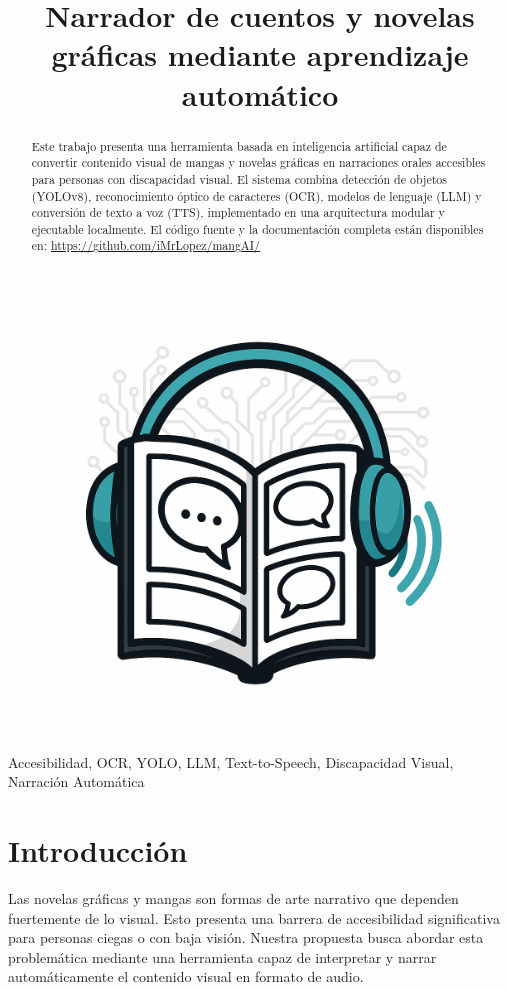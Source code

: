 \documentclass[conference]{IEEEtran}
\title{Narrador de cuentos y novelas gráficas mediante aprendizaje automático}
\author{\IEEEauthorblockN{Maverick Chacón, Marny López, Kendall Méndez}
\IEEEauthorblockA{Universidad CENFOTEC\\
Email: {mchacon, mlopez, kmendez}@ucenfotec.ac.cr}}
\begin{document}
\maketitle

\begin{figure}[ht]
\centering
\includegraphics[width=0.3\columnwidth]{resources/mangAI.png}
\end{figure}

\begin{abstract}
Este trabajo presenta una herramienta basada en inteligencia artificial capaz de convertir contenido visual de mangas y novelas gráficas en narraciones orales accesibles para personas con discapacidad visual. El sistema combina detección de objetos (YOLOv8), reconocimiento óptico de caracteres (OCR), modelos de lenguaje (LLM) y conversión de texto a voz (TTS), implementado en una arquitectura modular y ejecutable localmente. El código fuente y la documentación completa están disponibles en: \url{https://github.com/iMrLopez/mangAI/}
\end{abstract}

\begin{IEEEkeywords}
Accesibilidad, OCR, YOLO, LLM, Text-to-Speech, Discapacidad Visual, Narración Automática
\end{IEEEkeywords}

\section{Introducción}
Las novelas gráficas y mangas son formas de arte narrativo que dependen fuertemente de lo visual. Esto presenta una barrera de accesibilidad significativa para personas ciegas o con baja visión. Nuestra propuesta busca abordar esta problemática mediante una herramienta capaz de interpretar y narrar automáticamente el contenido visual en formato de audio.
\end{document}
